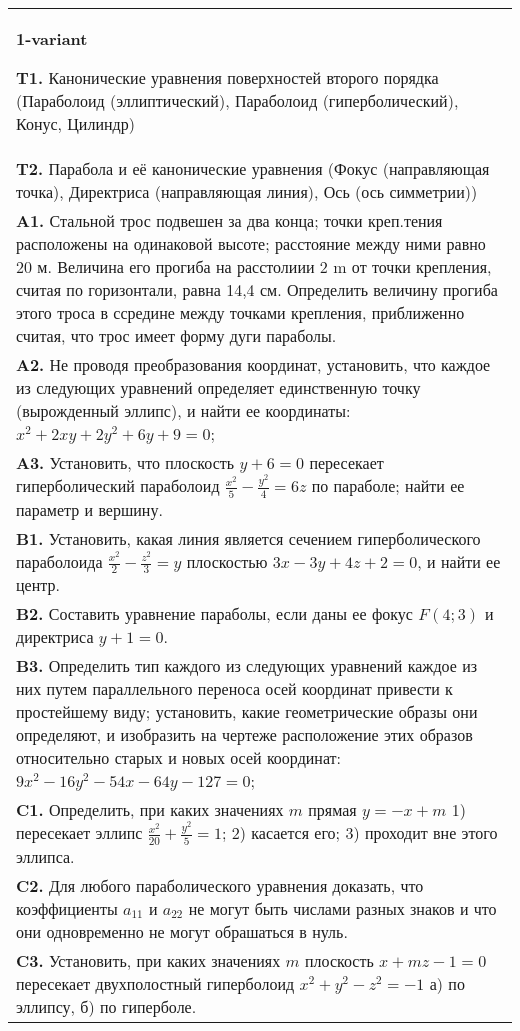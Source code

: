 \documentclass{article}
\begin{document}


\begin{tabular}{m{17cm}}
\textbf{1-variant}
\newline

\textbf{T1.} Канонические уравнения поверхностей второго порядка (Параболоид (эллиптический), Параболоид (гиперболический), Конус, Цилиндр) \\
\textbf{T2.} Парабола и её канонические уравнения (Фокус (направляющая точка), Директриса (направляющая линия), Ось (ось симметрии)) \\
\textbf{A1.} Стальной трос подвешен за два конца; точки креп.тения расположены на одинаковой высоте; расстояние между ними равно 20 м. Величина его прогиба на расстолиии 2 m от точки крепления, считая по горизонтали, равна 14,4 см. Определить величину прогиба этого троса в ссредине между точками крепления, приближенно считая, что трос имеет форму дуги параболы. \\
\textbf{A2.} Не проводя преобразования координат, установить, что каждое из следующих уравнений определяет единственную точку (вырожденный эллипс), и найти ее координаты: $x^2+2 x y+2 y^2+6 y+9=0$; \\
\textbf{A3.} Установить, что плоскость $y+6=0$ пересекает гиперболический параболоид $\frac{x^2}{5}-\frac{y^2}{4}=6 z$ по параболе; найти ее параметр и вершину. \\
\textbf{B1.} Установить, какая линия является сечением гиперболического параболоида $\frac{x^2}{2}-\frac{z^2}{3}=y$ плоскостью $3 x-3 y+4 z+2=0$, и найти ее центр. \\
\textbf{B2.} Составить уравнение параболы, если даны ее фокус $F(4 ; 3)$ и директриса $y+1=0$. \\
\textbf{B3.} Определить тип каждого из следующих уравнений каждое из них путем параллельного переноса осей координат привести к простейшему виду; установить, какие геометрические образы они определяют, и изобразить на чертеже расположение этих образов относительно старых и новых осей координат: $9 x^2-16 y^2-54 x-64 y-127=0$; \\
\textbf{C1.} Определить, при каких значениях $m$ прямая $y=-x+m$ 1) пересекает эллипс $\frac{x^2}{20}+\frac{y^2}{5}=1$; 2) касается его; 3) проходит вне этого эллипса. \\
\textbf{C2.} Для любого параболического уравнения доказать, что коэффициенты $a_{11}$ и $a_{22}$ не могут быть числами разных знаков и что они одновременно не могут обрашаться в нуль. \\
\textbf{C3.} Установить, при каких значениях $m$ плоскость $x+m z-1=0$ пересекает двухполостный гиперболоид $x^2+y^2-z^2=-1$ а) по эллипсу, б) по гиперболе. \\

\end{tabular}
\vspace{1cm}
\end{document}

